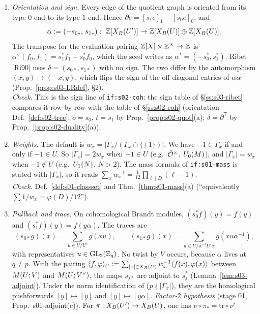 \begin{enumerate}[label=(C\arabic*)]
\item \emph{Orientation and sign.} Every edge of the quotient graph is oriented from its type-$0$ end to its type-$1$ end. Hence
  $\partial e=[s_1e]_1-[s_0e]_0$, and
  \[\alpha:=(-s_{0*},\,s_{1*}):\ \Z[\XB{U'}]\to\Z[\XB U]\oplus\Z[\XB U].\]
  The transpose for the evaluation pairing $\mathbb{Z}[X]\times\mathbb{Z}^X\to\mathbb{Z}$ is $\alpha^\vee(f_0,f_1)=s_1^*f_1-s_0^*f_0$, which the seed
  writes as $\alpha^*=(-s_0^*,s_1^*)$. Ribet [Ri90] uses $\delta=(s_{0*},s_{1*})$ with no sign. The two differ by the automorphism
  $(x,y)\mapsto(-x,y)$, which flips the sign of the off-diagonal entries of $\alpha\alpha^\dagger$
  (Prop.~\ref{prop:s03-LRdef}, \S2).\\
  \emph{Check.} This is the sign line of \texttt{if:s02-coh}: the sign table of \S\ref{ss:s03-ribet} compares it row by row with the table of
  \S\ref{ss:s02-coh} (orientation Def.~\ref{def:s02-tree}; $o=s_0$, $t=s_1$ by Prop.~\ref{prop:s02-quot}(a); $\delta=\partial^{\mathsf T}$ by
  Prop.~\ref{prop:s02-duality}(a)). \stproved
\item \emph{Weights.} The default is $w_x=|\Gamma_x/(\Gamma_x\cap\{\pm1\})|$. We have $-1\in\Gamma_x$ if and only if $-1\in U$. So $|\Gamma_x|=2w_x$
  when $-1\in U$ (e.g.\ $\hat{\mathcal{O}}^\times$, $U_0(M)$), and $|\Gamma_x|=w_x$ when $-1\notin U$ (e.g.\ $U_1(N)$, $N>2$). The
  mass formula of \texttt{if:s01-mass} is stated with $|\Gamma_x|$, so it reads $\sum_x w_x^{-1}=\frac1{12}\prod_{\ell\mid D}(\ell-1)$.\\
  \emph{Check.} Def.~\ref{def:s01-classset} and Thm.~\ref{thm:s01-mass}(a) (``equivalently $\sum1/w_x=\varphi(D)/12$''). \stproved
\item \emph{Pullback and trace.} On cohomological Brandt modules, $(s_0^*f)(y)=f(y)$ and $(s_1^*f)(y)=f(y\alpha)$. The traces are
  \[(s_{0*}g)(x)=\sum_{u\in U/U'}g(xu),\qquad (s_{1*}g)(x)=\sum_{u\in U/\alpha^{-1}U'\alpha}g(xu\alpha^{-1}),\]
  with representatives $u\in\mathrm{GL}_2(\mathbb{Z}_q)$. No twist by $V$ occurs, because $\alpha$ lives at $q\ne p$. With the pairing
  $\langle f,\varphi\rangle_U:=\sum_{[x]\in X_B(U)}w_x^{-1}\langle f(x),\varphi(x)\rangle$ between $M(U;V)$ and $M(U;V^\vee)$, the
  maps $s_{j*}$ are adjoint to $s_j^*$ (Lemma~\ref{lem:s03-adjoint}). Under the norm identification of  ($p\nmid|\Gamma_x|$),
  they are the homological pushforwards $[y]\mapsto[y]$ and $[y]\mapsto[y\alpha]$.
  \emph{Factor-$2$ hypothesis} (stage 01, Prop.~s01-adjoint(c)). For $\pi:X_B(U')\to X_B(U)$, one has $\nu\circ\pi_*=\mathrm{tr}\circ\nu'$

\end{enumerate}
